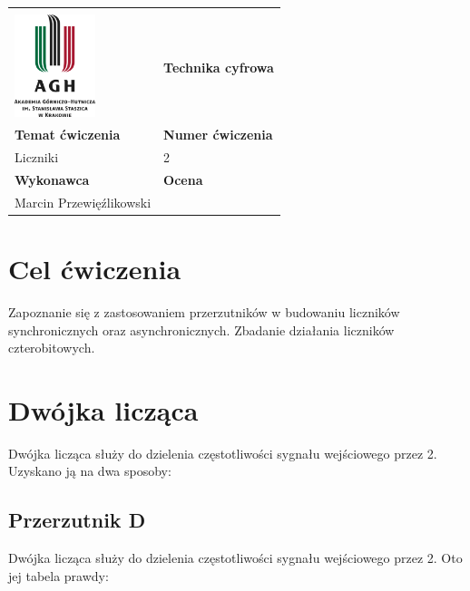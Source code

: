 \documentclass[12pt,a4paper]{article}
\begin{document}
\begin{table}[]
\label{my-label}
\begin{tabular}{|p{7.5cm}|p{7.5cm}|}
\hline
									           					&                           \\
\includegraphics[height=3cm]{logo}             					& \textbf{Technika cyfrowa} \\ \hline
\multicolumn{1}{|l|}{\textbf{Temat ćwiczenia}} 					& \textbf{Numer ćwiczenia}  \\
\multicolumn{1}{|l|}{Liczniki}	& 2                         \\ \hline
\multicolumn{1}{|l|}{\textbf{Wykonawca}}       & \textbf{Ocena}            \\
\multicolumn{1}{|l|}{Marcin Przewięźlikowski}          &                           \\ \hline
\end{tabular}
\end{table}

\section{Cel ćwiczenia}

Zapoznanie się z zastosowaniem przerzutników w budowaniu liczników synchronicznych oraz asynchronicznych. Zbadanie działania liczników czterobitowych.

\section{Dwójka licząca}


Dwójka licząca służy do dzielenia częstotliwości sygnału wejściowego przez 2. Uzyskano ją na dwa sposoby:

\subsection{Przerzutnik D}


Dwójka licząca służy do dzielenia częstotliwości sygnału wejściowego przez 2. Oto jej tabela prawdy:



\end{document}
